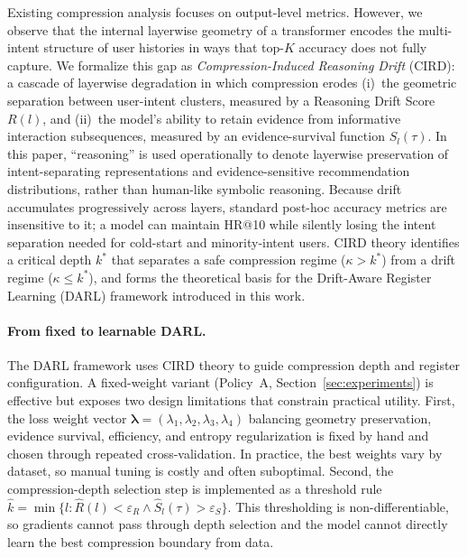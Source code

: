 \documentclass[lettersize,journal]{IEEEtran}
\begin{document}
Existing compression analysis focuses on output-level metrics.
However, we observe that the internal layerwise geometry of a
transformer encodes the multi-intent structure of user histories
in ways that top-$K$ accuracy does not fully capture.
We formalize this gap as \emph{Compression-Induced Reasoning Drift}
(CIRD): a cascade of layerwise degradation in which
compression erodes (i)~the geometric separation between
user-intent clusters, measured by a Reasoning Drift Score
$R(l)$, and (ii)~the model's ability to retain evidence from
informative interaction subsequences, measured by an
evidence-survival function $S_l(\tau)$.
In this paper, ``reasoning'' is used operationally to denote
layerwise preservation of intent-separating representations and
evidence-sensitive recommendation distributions, rather than
human-like symbolic reasoning.
Because drift accumulates progressively across layers,
standard post-hoc accuracy metrics are insensitive to it;
a model can maintain HR@10 while silently losing the intent
separation needed for cold-start and minority-intent users.
CIRD theory identifies a critical depth $k^*$ that separates
a safe compression regime ($\kappa > k^*$) from a drift
regime ($\kappa \leq k^*$), and forms the theoretical
basis for the Drift-Aware Register Learning (DARL)
framework introduced in this work.

\paragraph*{From fixed to learnable DARL.}
The DARL framework uses CIRD theory to guide compression depth and
register configuration.
A fixed-weight variant (Policy~A, Section~\ref{sec:experiments})
is effective but exposes two design limitations that constrain
practical utility.
First, the loss weight vector
$\boldsymbol{\lambda} = (\lambda_1, \lambda_2, \lambda_3, \lambda_4)$
balancing geometry preservation, evidence survival, efficiency, and
entropy regularization is fixed by hand and chosen through repeated
cross-validation.
In practice, the best weights vary by dataset, so manual tuning is
costly and often suboptimal.
Second, the compression-depth selection step is implemented as a
threshold rule $\hat{k} = \min\{l : \hat{R}(l) < \varepsilon_R \wedge
\hat{S}_l(\tau) > \varepsilon_S\}$.
This thresholding is non-differentiable, so gradients cannot pass
through depth selection and the model cannot directly learn the
best compression boundary from data.
\end{document}
